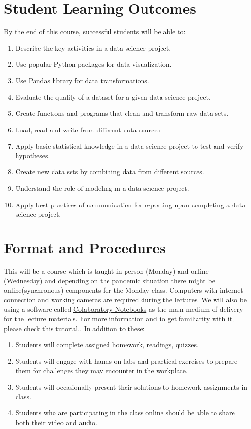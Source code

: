 \documentclass[11pt]{article}
\begin{document}
\section*{Student Learning Outcomes}

By the end of this course, successful students will be able to:
\begin{enumerate}
\item Describe the key activities in a data science project. 
\item Use popular Python packages for data visualization.
\item Use Pandas library for data transformations.
\item Evaluate the quality of a dataset for a given data science project.
\item Create functions and programs that clean and transform raw data sets.
\item Load, read and write from different data sources. 
\item Apply basic statistical knowledge in a data science project to test and verify hypotheses.
\item Create new data sets by combining data from different sources. 
\item Understand the role of modeling in a data science project.
\item Apply best practices of communication for reporting upon completing a data science project.
\end{enumerate}

\section*{Format and Procedures}

This will be a course which is taught in-person (Monday) and online (Wednesday) and depending on the pandemic situation there might be online(synchronous) components for the Monday class. Computers with internet connection and working cameras are required during the lectures. We will also be using a software called \href{https://research.google.com/colaboratory/faq.html}{Colaboratory Notebooks} as the main medium of delivery for the lecture materials. For more information and to get  familiarity with it, \href{https://colab.research.google.com/notebooks/intro.ipynb}{please check this tutorial.}. In addition to these:

\begin{enumerate}
	\item Students will complete assigned homework, readings, quizzes. 
	\item Students will engage with hands-on labs and practical exercises to prepare them for challenges they may encounter in the workplace.
	\item Students will occasionally present their solutions to homework assignments
in class.
	\item Students who are participating in the class online should be able to share both their video and audio. 
\end{enumerate}
\end{document}
